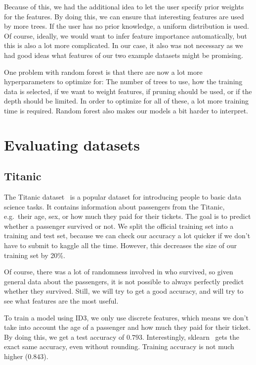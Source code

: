 \documentclass[a4paper]{article}
\begin{document}
Because of this, we had the additional idea to let the user specify prior weights for the features. By doing this, we can ensure that interesting features are used by more trees. If the user has no prior knowledge, a uniform distribution is used. Of course, ideally, we would want to infer feature importance automatically, but this is also a lot more complicated. In our case, it also was not necessary as we had good ideas what features of our two example datasets might be promising.

One problem with random forest is that there are now a lot more hyperparameters to optimize for: The number of trees to use, how the training data is selected, if we want to weight features, if pruning should be used, or if the depth should be limited. In order to optimize for all of these, a lot more training time is required. Random forest also makes our models a bit harder to interpret.

\section{Evaluating datasets}

\subsection{Titanic}

The Titanic dataset~\cite{titanic} is a popular dataset for introducing people to basic data science tasks. It contains information about passengers from the Titanic, e.g.\  their age, sex, or how much they paid for their tickets. The goal is to predict whether a passenger survived or not. We split the official training set into a training and test set, because we can check our accuracy a lot quicker if we don't have to submit to kaggle all the time. However, this decreases the size of our training set by 20\%.

Of course, there was a lot of randomness involved in who survived, so given general data about the passengers, it is not possible to always perfectly predict whether they survived. Still, we will try to get a good accuracy, and will try to see what features are the most useful.

To train a model using ID3, we only use discrete features, which means we don't take into account the age of a passenger and how much they paid for their ticket. By doing this, we get a test accuracy of $0.793$. Interestingly, sklearn~\cite{scikit-learn} gets the exact same accuracy, even without rounding. Training accuracy is not much higher ($0.843$).
\end{document}
